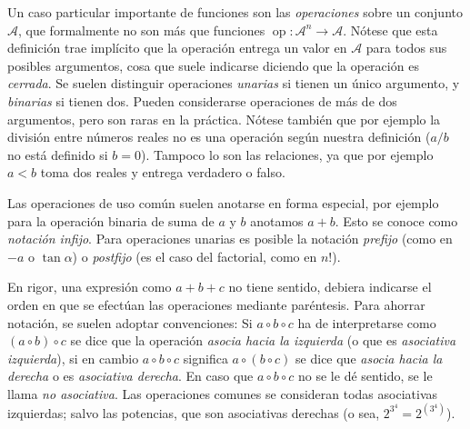  Un caso particular importante de funciones son las \emph{operaciones}
  sobre un conjunto \(\mathcal{A}\),
  que formalmente no son más
  que funciones
    \(\operatorname{op} \colon \mathcal{A}^n \rightarrow \mathcal{A}\).
  Nótese que esta definición trae implícito
  que la operación entrega un valor en \(\mathcal{A}\)
  para todos sus posibles argumentos,
  cosa que suele indicarse diciendo que la operación es \emph{cerrada}.%
  Se suelen distinguir operaciones \emph{unarias}%
  si tienen un único argumento,
  y \emph{binarias} si tienen dos.%
  Pueden considerarse operaciones de más de dos argumentos,
  pero son raras en la práctica.
  Nótese también que por ejemplo la división entre números reales
  no es una operación según nuestra definición
  (\(a / b\) no está definido si \(b = 0\)).
  Tampoco lo son las relaciones,
  ya que por ejemplo \(a < b\) toma dos reales y entrega verdadero o falso.

  Las operaciones de uso común suelen anotarse en forma especial,
  por ejemplo para la operación binaria
  de suma de \(a\) y \(b\) anotamos \(a + b\).
  Esto se conoce como \emph{notación infijo}.%
  Para operaciones unarias es posible la notación \emph{prefijo}%
  (como en \(- a\) o \(\tan \alpha\))
  o \emph{postfijo}%
  (es el caso del factorial,
   como en \(n!\)).

  En rigor,
  una expresión como \(a + b + c\) no tiene sentido,
  debiera indicarse el orden en que se efectúan las operaciones
  mediante paréntesis.
  Para ahorrar notación,
  se suelen adoptar convenciones:
  Si \(a \circ b \circ c\) ha de interpretarse como
  \((a \circ b) \circ c\)
  se dice que la operación \emph{asocia hacia la izquierda}%
  (o que es \emph{asociativa izquierda}),
  si en cambio \(a \circ b \circ c\)
  significa \(a \circ (b \circ c)\)
  se dice que \emph{asocia hacia la derecha}%
  o es \emph{asociativa derecha}.
  En caso que \(a \circ b \circ c\) no se le dé sentido,
  se le llama \emph{no asociativa}.%
  Las operaciones comunes se consideran todas asociativas izquierdas;
  salvo las potencias,
  que son asociativas derechas
  (o sea,
   \(2^{3^4} = 2^{(3^4)}\)).


